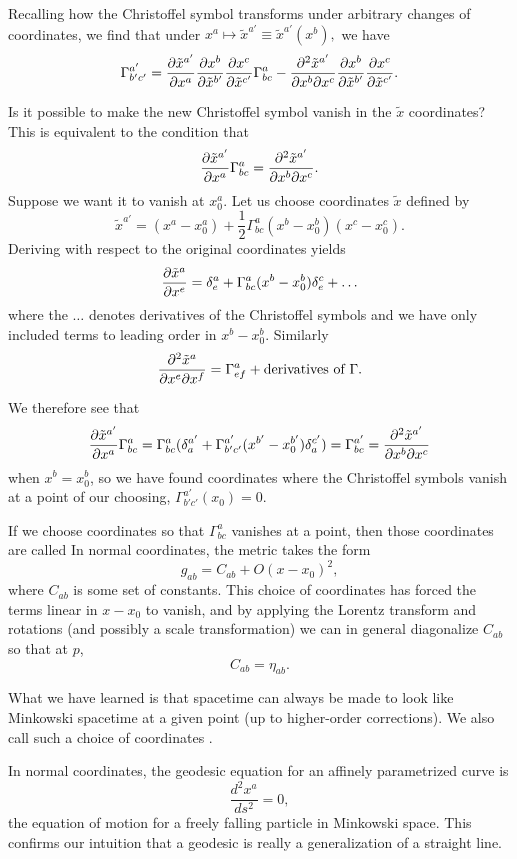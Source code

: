 Recalling how the Christoffel symbol transforms under arbitrary changes of coordinates, we find that under $x^a \mapsto \tilde x^{a'}\equiv \tilde x^{a'}(x^b),$ we have
$$\Gamma^{a'}_{b'c'}= \frac{\partial \tilde x^{a'}}{\partial x^a}\frac{\partial x^b}{\partial \tilde x^{b'}}\frac{\partial x^c}{\partial \tilde x^{c'}}\Gamma^a_{bc}-\frac{\partial^2 \tilde x^{a'}}{\partial  x^{b} \partial  x^{c}}\frac{\partial x^b}{\partial \tilde x^{b'}}\frac{\partial x^c}{\partial \tilde x^{c'}}.$$

Is it possible to make the new Christoffel symbol vanish in the $\tilde x$ coordinates? This is equivalent to the condition that
$$\frac{\partial \tilde x^{a'}}{\partial x^a} \Gamma^a_{bc}= \frac{\partial^2 \tilde x^{a'}}{\partial x^b \partial x^c}.$$ Suppose we want it to vanish at $x^a_0$. Let us choose coordinates $\tilde x$ defined by
$$\tilde x^{a'}=(x^a-x^a_0)+\frac{1}{2}\Gamma^a_{bc}(x^b-x_0^b)(x^c-x^c_0).$$
Deriving with respect to the original coordinates yields
$$\frac{\partial \tilde x^a}{\partial x^e}=\delta^a_e +\Gamma^a_{bc}(x^b-x^b_0)\delta^c_e+\ldots$$ where the $\ldots$ denotes derivatives of the Christoffel symbols and we have only included terms to leading order in $x^b-x^b_0$. Similarly
$$\frac{\partial^2 \tilde x^a}{\partial x^e \partial x^f}=\Gamma^a_{ef}+\text{derivatives of }\Gamma.$$

We therefore see that
$$\frac{\partial \tilde x^{a'}}{\partial x^a} \Gamma^a_{bc}= \Gamma^a_{bc} (\delta^{a'}_a +\Gamma^{a'}_{b'c'}(x^{b'}-x^{b'}_0)\delta^{c'}_a)=\Gamma^{a'}_{bc}= \frac{\partial^2 \tilde x^{a'}}{\partial x^b \partial x^c}$$
when $x^b=x^b_0$, so we have found coordinates where the Christoffel symbols vanish at a point of our choosing, $\Gamma^{a'}_{b'c'}(x_0)=0$.

\begin{defn}
If we choose coordinates so that $\Gamma^a_{bc}$ vanishes at a point, then those coordinates are called  In normal coordinates, the metric takes the form
$$g_{ab}=C_{ab}+O(x-x_0)^2,$$
where $C_{ab}$ is some set of constants. This choice of coordinates has forced the terms linear in $x-x_0$ to vanish, and by applying the Lorentz transform and rotations (and possibly a scale transformation) we can in general diagonalize $C_{ab}$ so that at $p$,
$$C_{ab}=\eta_{ab}.$$
\end{defn}
What we have learned is that spacetime can always be made to look like Minkowski spacetime at a given point (up to higher-order corrections). We also call such a choice of coordinates .

In normal coordinates, the geodesic equation for an affinely parametrized curve is
$$\frac{d^2x^a}{ds^2}=0,$$
the equation of motion for a freely falling particle in Minkowski space. This confirms our intuition that a geodesic is really a generalization of a straight line.

